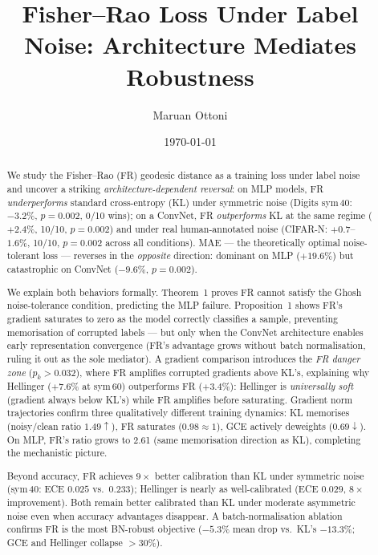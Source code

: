 \documentclass[11pt]{article}
\title{Fisher--Rao Loss Under Label Noise: Architecture Mediates Robustness}
\author{Maruan Ottoni}
\date{\today}
\begin{document}
\maketitle

\begin{abstract}
We study the Fisher--Rao (FR) geodesic distance as a training loss under label noise
and uncover a striking \emph{architecture-dependent reversal}: on MLP models, FR
\emph{underperforms} standard cross-entropy (KL) under symmetric noise (Digits
sym\,40: $-3.2\%$, $p{=}0.002$, 0/10 wins); on a ConvNet, FR \emph{outperforms}
KL at the same regime ($+2.4\%$, 10/10, $p{=}0.002$) and under real human-annotated
noise (CIFAR-N: $+0.7$--$1.6\%$, 10/10, $p{=}0.002$ across all conditions).
MAE --- the theoretically optimal noise-tolerant loss --- reverses in the
\emph{opposite} direction: dominant on MLP ($+19.6\%$) but catastrophic on ConvNet
($-9.6\%$, $p{=}0.002$).

We explain both behaviors formally.
Theorem~1 proves FR cannot satisfy the Ghosh noise-tolerance condition, predicting
the MLP failure.
Proposition~1 shows FR's gradient saturates to zero as the model correctly classifies
a sample, preventing memorisation of corrupted labels --- but only when the
ConvNet architecture enables early representation convergence (FR's advantage
grows without batch normalisation, ruling it out as the sole mediator).
A gradient comparison introduces the \emph{FR danger zone} ($p_k > 0.032$), where FR
amplifies corrupted gradients above KL's, explaining why Hellinger
($+7.6\%$ at sym\,60) outperforms FR ($+3.4\%$): Hellinger is \emph{universally soft}
(gradient always below KL's) while FR amplifies before saturating.
Gradient norm trajectories confirm three qualitatively different training dynamics:
KL memorises (noisy/clean ratio $1.49\uparrow$), FR saturates ($0.98\approx 1$),
GCE actively deweights ($0.69\downarrow$).
On MLP, FR's ratio grows to 2.61 (same memorisation direction as KL), completing
the mechanistic picture.

Beyond accuracy, FR achieves $9\times$ better calibration than KL under symmetric
noise (sym\,40: ECE $0.025$ vs.\ $0.233$); Hellinger is nearly as well-calibrated
(ECE $0.029$, $8\times$ improvement).
Both remain better calibrated than KL under moderate asymmetric noise even when
accuracy advantages disappear.
A batch-normalisation ablation confirms FR is the most BN-robust objective
($-5.3\%$ mean drop vs.\ KL's $-13.3\%$; GCE and Hellinger collapse $>30\%$).
\end{abstract}
\end{document}

